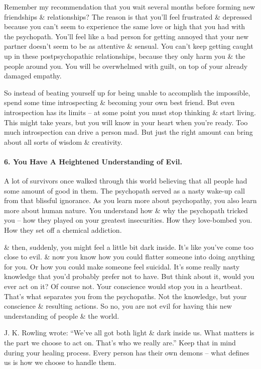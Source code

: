 \documentclass{article}
\numberwithin{equation}{section}
\begin{document}
Remember my recommendation that you wait several months before forming new friendships \& relationships? The reason is that you'll feel frustrated \& depressed because you can't seem to experience the same love or high that you had with the psychopath. You'll feel like a bad person for getting annoyed that your new partner doesn't seem to be as attentive \& sensual. You can't keep getting caught up in these postpsychopathic relationships, because they only harm you \& the people around you. You will be overwhelmed with guilt, on top of your already damaged empathy.

So instead of beating yourself up for being unable to accomplish the impossible, spend some time introspecting \& becoming your own best friend. But even introspection has its limits -- at some point you must stop thinking \& start living. This might take years, but you will know in your heart when you're ready. Too much introspection can drive a person mad. But just the right amount can bring about all sorts of wisdom \& creativity.

\paragraph{6. You Have A Heightened Understanding of Evil.} A lot of survivors once walked through this world believing that all people had some amount of good in them. The psychopath served as a nasty wake-up call from that blissful ignorance. As you learn more about psychopathy, you also learn more about human nature. You understand how \& why the psychopath tricked you -- how they played on your greatest insecurities. How they love-bombed you. How they set off a chemical addiction.

\& then, suddenly, you might feel a little bit dark inside. It's like you've come too close to evil. \& now you know how you could flatter someone into doing anything for you. Or how you could make someone feel suicidal. It's some really nasty knowledge that you'd probably prefer not to have. But think about it, would you ever act on it? Of course not. Your conscience would stop you in a heartbeat. That's what separates you from the psychopaths. Not the knowledge, but your conscience \& resulting actions. So no, you are not evil for having this new understanding of people \& the world.

J. K. Rowling wrote: ``We've all got both light \& dark inside us. What matters is the part we choose to act on. That's who we really are.'' Keep that in mind during your healing process. Every person has their own demons -- what defines us is how we choose to handle them.
\end{document}
